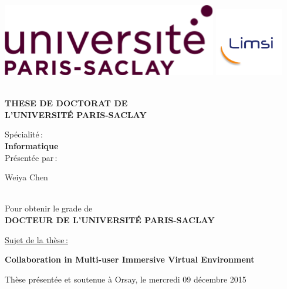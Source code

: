 \begin{titlepage}

\includegraphics[height=2.cm]{./logos/logo_saclay}\hfill
\includegraphics[height=3cm]{./logos/LogoLimsi2015}\hfill
\\
\\

\begin{center}
  \begin{Large}
    \textbf{THESE DE DOCTORAT DE\\ L'UNIVERSIT\'E PARIS-SACLAY\\}
  \end{Large}
  Sp\'ecialit\'e\,:\\
  \textbf{Informatique}\\ 
  Pr\'esent\'ee par\,:\\ 
  \begin{LARGE}
    Weiya Chen\end{LARGE}\\
  Pour obtenir le grade de\\
  \textbf{DOCTEUR DE L'UNIVERSIT\'E PARIS-SACLAY}
\end{center}

\noindent \underline{Sujet de la thèse\,:}\\
\begin{center}
  \begin{Large}
    {\textbf{Collaboration in Multi-user Immersive Virtual Environment}}
  \end{Large}
\end{center}

Thèse présentée et soutenue à Orsay, le mercredi 09 décembre 2015\\


\end{titlepage}
